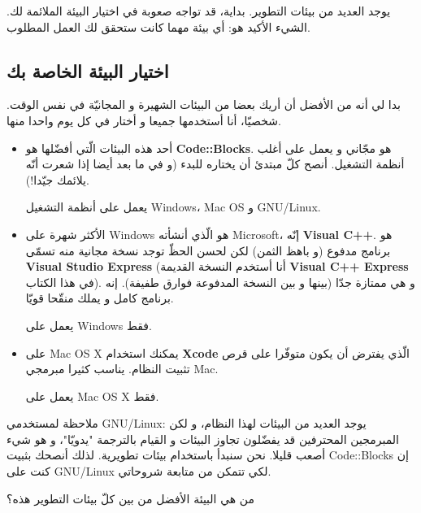 يوجد العديد من بيئات التطوير. بداية، قد تواجه صعوبة في اختيار البيئة الملائمة لك. الشيء الأكيد هو: أي بيئة مهما كانت ستحقق لك العمل المطلوب.

\subsection{اختيار البيئة الخاصة بك}

بدا لي أنه من الأفضل أن أريك بعضا من البيئات الشهيرة و المجانيّة في نفس الوقت. شخصيّا، أنا أستخدمها جميعا و أختار في كل يوم  واحدا منها.

\begin{itemize}
  \item أحد هذه البيئات الّتي أفضّلها هو
\textbf{\textenglish{Code::Blocks}}.
هو مجّاني و يعمل على أغلب أنظمة التشغيل. أنصح كلّ مبتدئ أن يختاره للبدء (و في ما بعد أيضا إذا شعرت أنّه يلائمك جيّدا!).

يعمل على أنظمة التشغيل
\textenglish{Windows}،
\textenglish{Mac OS}
و
\textenglish{GNU/Linux}.
  \item الأكثر شهرة على
\textenglish{Windows}
هو الّذي أنشأته
\textenglish{Microsoft}،
إنّه
\textbf{\textenglish{Visual C++}}.
هو برنامج مدفوع (و باهظ الثمن) لكن لحسن الحظّ توجد نسخة مجانية منه تسمّى
\textbf{\textenglish{Visual Studio Express}}
(أنا أستخدم النسخة القديمة
\textbf{\textenglish{Visual C++ Express}}
في هذا الكتاب). و هي ممتازة جدّا (بينها و بين النسخة المدفوعة فوارق طفيفة). إنه برنامج كامل و يملك منقّحا قويّا.

يعمل على
\textenglish{Windows}
فقط.
  \item على
\textenglish{Mac OS X}
يمكنك استخدام
\textbf{\textenglish{Xcode}}
الّذي يفترض أن يكون متوفّرا على قرص تثبيت النظام. يناسب كثيرا مبرمجي
\textenglish{Mac}.

يعمل على
\textenglish{Mac OS X}
فقط.
\end{itemize}

\begin{information}
  ملاحظة لمستخدمي
  \textenglish{GNU/Linux}:
  يوجد العديد من البيئات لهذا النظام، و لكن المبرمجين المحترفين قد يفضّلون تجاوز البيئات و القيام بالترجمة "يدويّا"، و هو شيء أصعب قليلا. نحن سنبدأ باستخدام بيئات تطويرية. لذلك أنصحك بثبيت
  \textenglish{Code::Blocks}
  إن كنت على
  \textenglish{GNU/Linux}
  لكي تتمكن من متابعة شروحاتي.
\end{information}

\begin{question}
من هي البيئة الأفضل من بين كلّ بيئات التطوير هذه؟
\end{question}


